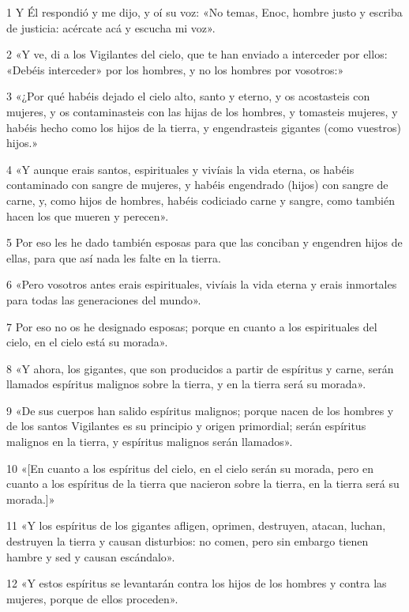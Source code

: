 \par 1 Y Él respondió y me dijo, y oí su voz: «No temas, Enoc, hombre justo y escriba de justicia: acércate acá y escucha mi voz».
\par 2 «Y ve, di a los Vigilantes del cielo, que te han enviado a interceder por ellos: «Debéis interceder» por los hombres, y no los hombres por vosotros:»
\par 3 «¿Por qué habéis dejado el cielo alto, santo y eterno, y os acostasteis con mujeres, y os contaminasteis con las hijas de los hombres, y tomasteis mujeres, y habéis hecho como los hijos de la tierra, y engendrasteis gigantes (como vuestros) hijos.»
\par 4 «Y aunque erais santos, espirituales y vivíais la vida eterna, os habéis contaminado con sangre de mujeres, y habéis engendrado (hijos) con sangre de carne, y, como hijos de hombres, habéis codiciado carne y sangre, como también hacen los que mueren y perecen».
\par 5 Por eso les he dado también esposas para que las conciban y engendren hijos de ellas, para que así nada les falte en la tierra.
\par 6 «Pero vosotros antes erais espirituales, vivíais la vida eterna y erais inmortales para todas las generaciones del mundo».
\par 7 Por eso no os he designado esposas; porque en cuanto a los espirituales del cielo, en el cielo está su morada».
\par 8 «Y ahora, los gigantes, que son producidos a partir de espíritus y carne, serán llamados espíritus malignos sobre la tierra, y en la tierra será su morada».
\par 9 «De sus cuerpos han salido espíritus malignos; porque nacen de los hombres y de los santos Vigilantes es su principio y origen primordial; serán espíritus malignos en la tierra, y espíritus malignos serán llamados».
\par 10 «[En cuanto a los espíritus del cielo, en el cielo serán su morada, pero en cuanto a los espíritus de la tierra que nacieron sobre la tierra, en la tierra será su morada.]»
\par 11 «Y los espíritus de los gigantes afligen, oprimen, destruyen, atacan, luchan, destruyen la tierra y causan disturbios: no comen, pero sin embargo tienen hambre y sed y causan escándalo».
\par 12 «Y estos espíritus se levantarán contra los hijos de los hombres y contra las mujeres, porque de ellos proceden».

